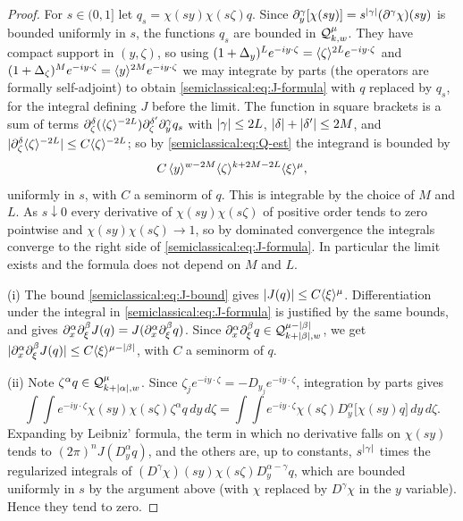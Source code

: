 \begin{proof}
  For $s\in(0,1]$ let $q_s=\chi(sy)\chi(s\zeta)q$. Since
  $\partial^\gamma_y[\chi(sy)]=s^{\lvert \gamma\rvert}(\partial^\gamma\chi)(sy)$ is bounded uniformly in
  $s$, the functions $q_s$ are bounded in $\mathcal{Q}^{\mu}_{k,w}$. They have compact
  support in $(y,\zeta)$, so using
  $(1+\Delta_y)^Le^{-iy\cdot\zeta}=\langle \zeta\rangle^{2L}e^{-iy\cdot\zeta}$ and
  $(1+\Delta_\zeta)^Me^{-iy\cdot\zeta}=\langle y\rangle^{2M}e^{-iy\cdot\zeta}$ we may
  integrate by parts (the operators are formally self-adjoint) to obtain
  \eqref{semiclassical:eq:J-formula} with $q$ replaced by $q_s$, for the
  integral defining $J$ before the limit. The function in square brackets is a
  sum of terms $\partial^\delta_\zeta(\langle \zeta\rangle^{-2L})\partial^{\delta'}_\zeta\partial^\gamma_yq_s$ with
  $\lvert \gamma\rvert\le2L$, $\lvert \delta\rvert+\lvert \delta'\rvert\le2M$, and
  $\lvert \partial^\delta_\zeta\langle \zeta\rangle^{-2L}\rvert\le C\langle \zeta\rangle^{-2L}$; so by
  \eqref{semiclassical:eq:Q-est} the integrand is bounded by
  \begin{equation}\label{semiclassical:eq:J-bound}
    C\,\langle y\rangle^{w-2M}\langle \zeta\rangle^{k+2M-2L}\langle \xi\rangle^\mu,
  \end{equation}
  uniformly in $s$, with $C$ a seminorm of $q$. This is integrable by the
  choice of $M$ and $L$. As $s\downarrow0$ every derivative of $\chi(sy)\chi(s\zeta)$ of
  positive order tends to zero pointwise and $\chi(sy)\chi(s\zeta)\to1$, so by
  dominated convergence the integrals converge to the right side of
  \eqref{semiclassical:eq:J-formula}. In particular the limit exists and the
  formula does not depend on $M$ and $L$.

  (i) The bound \eqref{semiclassical:eq:J-bound} gives
  $\lvert J(q)\rvert\le C\langle \xi\rangle^\mu$. Differentiation under the integral in
  \eqref{semiclassical:eq:J-formula} is justified by the same bounds, and gives
  $\partial^\alpha_x\partial^\beta_\xi J(q)=J(\partial^\alpha_x\partial^\beta_\xi q)$. Since
  $\partial^\alpha_x\partial^\beta_\xi q\in\mathcal{Q}^{\mu-\lvert \beta\rvert}_{k+\lvert \beta\rvert,w}$, we get
  $\lvert \partial^\alpha_x\partial^\beta_\xi J(q)\rvert\le C\langle \xi\rangle^{\mu-\lvert \beta\rvert}$, with $C$ a
  seminorm of $q$.

  (ii) Note $\zeta^\alpha q\in\mathcal{Q}^{\mu}_{k+\lvert \alpha\rvert,w}$. Since
  $\zeta_je^{-iy\cdot\zeta}=-D_{y_j}e^{-iy\cdot\zeta}$, integration by parts gives
  \begin{equation*}
    \int\!\!\int e^{-iy\cdot\zeta}\chi(sy)\chi(s\zeta)\zeta^\alpha q\,dy\,d\zeta
    =\int\!\!\int e^{-iy\cdot\zeta}\chi(s\zeta)D^\alpha_y\bigl[\chi(sy)q\bigr]\,dy\,d\zeta .
  \end{equation*}
  Expanding by Leibniz' formula, the term in which no derivative falls on
  $\chi(sy)$ tends to $(2\pi)^nJ(D^\alpha_yq)$, and the others are, up to
  constants, $s^{\lvert \gamma\rvert}$ times the regularized integrals of
  $(D^\gamma\chi)(sy)\chi(s\zeta)D^{\alpha-\gamma}_yq$, which are bounded uniformly in
  $s$ by the argument above (with $\chi$ replaced by $D^\gamma\chi$ in the $y$
  variable). Hence they tend to zero.


\end{proof}
